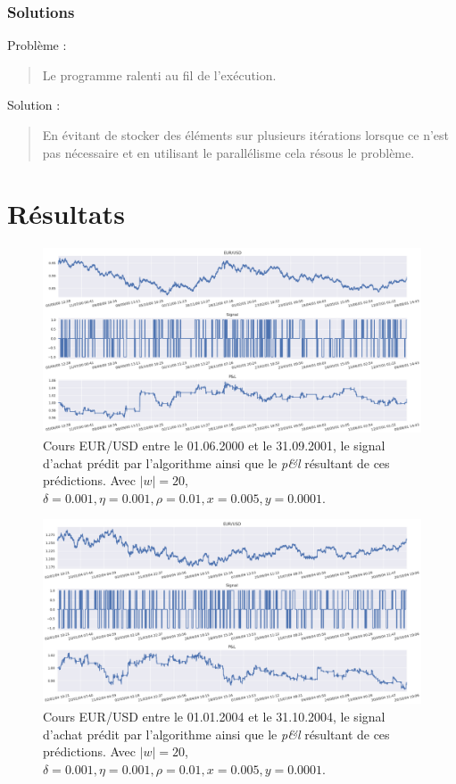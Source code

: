 \documentclass{beamer}
\begin{document}
	\begin{frame}
		\frametitle{Solutions}
		Problème :
		\begin{quote}
			Le programme ralenti au fil de l'exécution.
		\end{quote}
		
		Solution :
		\begin{quote}
			En évitant de stocker des éléments sur plusieurs itérations lorsque ce n'est pas nécessaire et en utilisant le parallélisme cela résous le problème.
		\end{quote}
	\end{frame}
	
	\section{Résultats}

	\begin{frame}
		\begin{figure}
			\includegraphics[scale=0.275]{res/eursud_2000-2001}
			\caption[Blup]{Cours EUR/USD entre le 01.06.2000 et le 31.09.2001, le signal d'achat prédit par l'algorithme ainsi que le \textit{p\&l} résultant de ces prédictions. Avec $|w| = 20$, $\delta = 0.001, \eta=0.001,\rho=0.01, x = 0.005, y=0.0001$.}
		\end{figure}
	\end{frame}

	\begin{frame}
		\begin{figure}
			\includegraphics[scale=0.275]{res/eurusd_2004-2005}				\caption[Blup]{Cours EUR/USD entre le 01.01.2004 et le 31.10.2004, le signal d'achat prédit par l'algorithme ainsi que le \textit{p\&l} résultant de ces prédictions. Avec $|w| = 20$, $\delta = 0.001, \eta=0.001,\rho=0.01, x = 0.005, y=0.0001$.}
		\end{figure}
	\end{frame}
\end{document}
